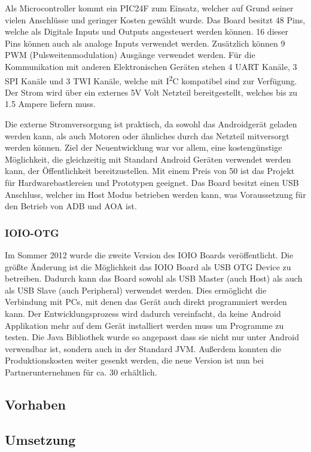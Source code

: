 \documentclass[12pt,journal,compsoc]{IEEEtran}
\begin{document}
Als Microcontroller kommt ein PIC24F zum Einsatz, welcher auf Grund seiner vielen Anschlüsse und geringer Kosten gewählt wurde.
Das Board besitzt 48 Pins, welche als Digitale Inputs und Outputs angesteuert werden können. 16 dieser Pins können auch als analoge Inputs verwendet werden.
Zusätzlich können 9 PWM (Pulsweitenmodulation) Ausgänge verwendet werden.
Für die Kommunikation mit anderen Elektronischen Geräten stehen 4 UART Kanäle, 3 SPI Kanäle und 3 TWI Kanäle, welche mit I\textsuperscript{2}C kompatibel sind zur Verfügung.
Der Strom wird über ein externes 5V Volt Netzteil bereitgestellt, welches bis zu 1.5 Ampere liefern muss.

Die externe Stromversorgung ist praktisch, da sowohl das Androidgerät geladen werden kann, als auch Motoren oder ähnliches durch das Netzteil mitversorgt werden können.
Ziel der Neuentwicklung war vor allem, eine kostengünstige Möglichkeit, die gleichzeitig mit Standard Android Geräten verwendet werden kann, der Öffentlichkeit bereitzustellen.
Mit einem Preis von 50\textdollar{} ist das Projekt für Hardwarebastlereien und Prototypen geeignet.
Das Board besitzt einen USB Anschluss, welcher im Host Modus betrieben werden kann, was Voraussetzung für den Betrieb von ADB und AOA ist.

\subsubsection{IOIO-OTG}
Im Sommer 2012 wurde die zweite Version des IOIO Boards veröffentlicht.
Die größte Änderung ist die Möglichkeit das IOIO Board als USB OTG Device zu betreiben.
Dadurch kann das Board sowohl als USB Master (auch Host) als auch als USB Slave (auch Peripheral) verwendet werden.
Dies ermöglicht die Verbindung mit PCs, mit denen das Gerät auch direkt programmiert werden kann.
Der Entwicklungsprozess wird dadurch vereinfacht, da keine Android Applikation mehr auf dem Gerät installiert werden muss um Programme zu testen.
Die Java Bibliothek wurde so angepasst dass sie nicht nur unter Android verwendbar ist, sondern auch in der Standard JVM.
Außerdem konnten die Produktionskosten weiter gesenkt werden, die neue Version ist nun bei Partnerunternehmen für ca. 30\textdollar{} erhältlich.

\subsection{Vorhaben}

\subsection{Umsetzung}
\end{document}
